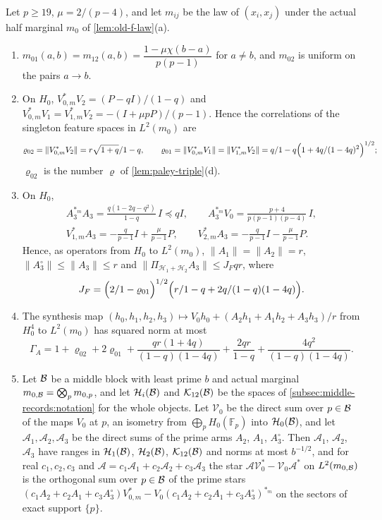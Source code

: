 \begin{lemma}\label{lem:actual-features}
Let $p\ge19$, $\mu=2/(p-4)$, and let $m_{ij}$ be the law of $(x_i,x_j)$ under
the actual half marginal $m_0$ of \cref{lem:old-f-law}(a).
\begin{enumerate}[label=(\alph*)]
\item $m_{01}(a,b)=m_{12}(a,b)=\dfrac{1-\mu\chi(b-a)}{p(p-1)}$ for $a\ne b$, and
 $m_{02}$ is uniform on the pairs $a\to b$.
\item On $H_0$, $V^*_{0,m}V_2=(P-qI)/(1-q)$ and
 $V^*_{0,m}V_1=V^*_{1,m}V_2=-(I+\mu pP)/(p-1)$. Hence the correlations of the
 singleton feature spaces in $L^2(m_0)$ are
 \[
  \varrho_{02}=\|V^*_{0,m}V_2\|=\frac{r\sqrt{1+q}}{1-q},\qquad
  \varrho_{01}=\|V^*_{0,m}V_1\|=\|V^*_{1,m}V_2\|
  =\frac q{1-q}\Bigl(1+\frac{4q}{(1-4q)^2}\Bigr)^{1/2};
 \]
 $\varrho_{02}$ is the number $\varrho$ of \cref{lem:paley-triple}(d).
\item On $H_0$,
 \begin{gather*}
  A_3^{*_m}A_3=\frac{q(1-2q-q^2)}{1-q}\,I\preceq qI,\qquad
  A_3^{*_m}V_0=\frac{p+4}{p(p-1)(p-4)}\,I,\\
  V^*_{1,m}A_3=-\frac q{p-1}I+\frac\mu{p-1}P,\qquad
  V^*_{2,m}A_3=-\frac q{p-1}I-\frac\mu{p-1}P .
 \end{gather*}
 Hence, as operators from $H_0$ to $L^2(m_0)$, $\|A_1\|=\|A_2\|=r$,
 $\|A_3^\circ\|\le\|A_3\|\le r$ and $\|\Pi_{\mathcal H_1+\mathcal H_2}A_3\|\le J_Fqr$,
 where
 \[
  J_F=\Bigl(\frac2{1-\varrho_{01}}\Bigr)^{1/2}
  \Bigl(\frac r{1-q}+\frac{2q}{(1-q)(1-4q)}\Bigr).
 \]
\item The synthesis map $(h_0,h_1,h_2,h_3)\mapsto V_0h_0+(A_2h_1+A_1h_2+A_3h_3)/r$
 from $H_0^4$ to $L^2(m_0)$ has squared norm at most
 \[
  \Gamma_A=1+\varrho_{02}+2\varrho_{01}+\frac{qr(1+4q)}{(1-q)(1-4q)}
  +\frac{2qr}{1-q}+\frac{4q^2}{(1-q)(1-4q)} .
 \]
\item Let $\Blk$ be a middle block with least prime $b$ and actual marginal
 $m_{0,\Blk}=\bigotimes_pm_{0,p}$, and let $\mathcal H_i(\Blk)$ and
 $\mathcal K_{12}(\Blk)$ be the spaces of \cref{subsec:middle-records:notation}
 for the whole objects. Let $\mathcal V_0$ be the direct sum over $p\in\Blk$
 of the maps $V_0$ at $p$, an isometry from $\bigoplus_pH_0(\mathbb F_p)$
 into $\mathcal H_0(\Blk)$, and let $\mathcal A_1,\mathcal A_2,\mathcal A_3$ be
 the direct sums of the prime arms $A_2$, $A_1$, $A_3^\circ$. Then
 $\mathcal A_1$, $\mathcal A_2$, $\mathcal A_3$ have ranges in $\mathcal H_1(\Blk)$,
 $\mathcal H_2(\Blk)$, $\mathcal K_{12}(\Blk)$ and norms at most $b^{-1/2}$, and
 for real $c_1,c_2,c_3$ and $\mathcal A=c_1\mathcal A_1+c_2\mathcal A_2+c_3\mathcal A_3$
 the star $\mathcal A\mathcal V_0^*-\mathcal V_0\mathcal A^*$ on $L^2(m_{0,\Blk})$
 is the orthogonal sum over $p\in\Blk$ of the prime stars
 $(c_1A_2+c_2A_1+c_3A_3^\circ)V^*_{0,m}-V_0(c_1A_2+c_2A_1+c_3A_3^\circ)^{*_m}$ on the
 sectors of exact support $\{p\}$.
\end{enumerate}
\end{lemma}

